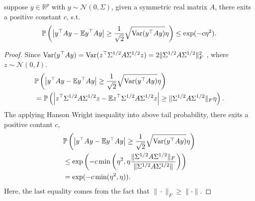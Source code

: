\begin{lem}
\label{lemma: variant_hanson_wright}
suppose $y\in \mathbb{R}^p$ with $y\sim \mathcal{N}(0, \Sigma)$, given a symmetric real matrix $A$, there exits a positive constant $c$, s.t. 
\begin{equation}
\mathbb{P}\left(\left|y^\top A y - \mathbb{E} y^\top A y\right|\ge \frac{1}{\sqrt{2}}\sqrt{\mbox{Var}(y^\top A y)}\eta \right)\le \exp(-c\eta^2).
\end{equation}
\begin{proof}
Since $\mbox{Var}(y^\top A y) = \mbox{Var}(z^\top\Sigma^{1/2}A\Sigma^{1/2}z) = 2\|\Sigma^{1/2}A\Sigma^{1/2}\|_F^2$ \citep{rencher2008linear}, where $z\sim \mathcal{N}(0, I)$. 
\begin{equation}
\begin{aligned}
&\mathbb{P}\left(\left|y^\top A y - \mathbb{E} y^\top A y\right|\ge \frac{1}{\sqrt{2}}\sqrt{\mbox{Var}(y^\top A y)}\eta \right)\\
&= \mathbb{P}\left(\left|z^\top \Sigma^{1/2}A\Sigma^{1/2} z - \mathbb{E} z^\top \Sigma^{1/2}A\Sigma^{1/2} z\right|\ge \|\Sigma^{1/2}A\Sigma^{1/2}\|_F \eta \right). 
\end{aligned}
\end{equation}
The applying Hanson Wright inequality \citep{rudelson2013hanson} into above tail probability, there exits a positive contant $c$,
\begin{equation}
\begin{aligned}
&\mathbb{P}\left(\left|y^\top A y - \mathbb{E} y^\top A y\right|\ge \frac{1}{\sqrt{2}}\sqrt{\mbox{Var}(y^\top A y)}\eta \right)\\
& \le \exp\left(-c \min \left(\eta^2, \eta \frac{\|\Sigma^{1/2}A\Sigma^{1/2}\|_F}{\|\Sigma^{1/2}A\Sigma^{1/2}\|}\right)\right)\\
& = \exp(-c\min(\eta^2, \eta)).
\end{aligned}
\end{equation}
Here, the last equality comes from the fact that $\|\cdot\|_F\ge \|\cdot\|$. 
\end{proof}
\end{lem}

